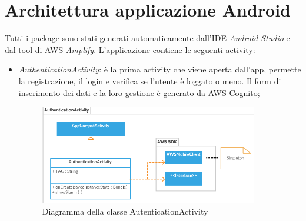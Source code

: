 \clearpage
\section{Architettura applicazione Android}

Tutti i package sono stati generati automaticamente dall'IDE \emph{Android Studio} e dal tool di AWS \emph{Amplify}. L'applicazione contiene le seguenti activity:

\begin{itemize}
    \item \emph{AuthenticationActivity}: è la prima activity che viene aperta dall'app, permette la registrazione, il login e verifica se l'utente è loggato o meno. Il form di inserimento dei dati e la loro gestione è generato da AWS Cognito;
        \begin{figure}[H]
        \begin{center}
            \includegraphics[width=0.9\textwidth, keepaspectratio]{../includes/pics/authenticationactivity.png}
            \caption{Diagramma della classe AutenticationActivity}
        \end{center}
        \end{figure}



\end{itemize}

